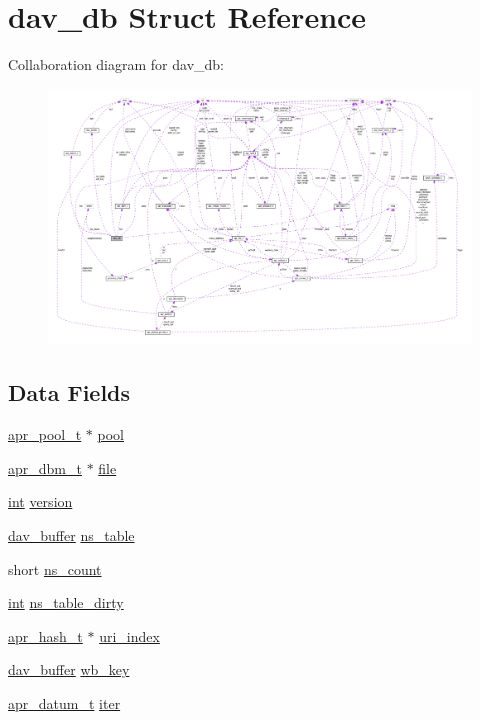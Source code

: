 \hypertarget{structdav__db}{}\section{dav\+\_\+db Struct Reference}
\label{structdav__db}


Collaboration diagram for dav\+\_\+db\+:
\nopagebreak
\begin{figure}[H]
\begin{center}
\leavevmode
\includegraphics[width=350pt]{structdav__db__coll__graph}
\end{center}
\end{figure}
\subsection*{Data Fields}
\begin{DoxyCompactItemize}
\item 
\hyperlink{structapr__pool__t}{apr\+\_\+pool\+\_\+t} $\ast$ \hyperlink{structdav__db_abdc510467d96807a3a9126b408ce2cfe}{pool}
\item 
\hyperlink{structapr__dbm__t}{apr\+\_\+dbm\+\_\+t} $\ast$ \hyperlink{structdav__db_a7561c0d3f8264bd9afb7194dcc48be98}{file}
\item 
\hyperlink{pcre_8txt_a42dfa4ff673c82d8efe7144098fbc198}{int} \hyperlink{structdav__db_a2703c564ab6767305b64972df53fde27}{version}
\item 
\hyperlink{structdav__buffer}{dav\+\_\+buffer} \hyperlink{structdav__db_a36b4801eebea2ac01d1b3f1320976b07}{ns\+\_\+table}
\item 
short \hyperlink{structdav__db_a6a13abe6c78b05f64a20984856ca2b06}{ns\+\_\+count}
\item 
\hyperlink{pcre_8txt_a42dfa4ff673c82d8efe7144098fbc198}{int} \hyperlink{structdav__db_a3e677b5ee2700749a9a72e3a3c26bf87}{ns\+\_\+table\+\_\+dirty}
\item 
\hyperlink{structapr__hash__t}{apr\+\_\+hash\+\_\+t} $\ast$ \hyperlink{structdav__db_ac73ba0df7375febb3fd32baec03714a1}{uri\+\_\+index}
\item 
\hyperlink{structdav__buffer}{dav\+\_\+buffer} \hyperlink{structdav__db_a17375a25f98cd2f5edd4b133803dab70}{wb\+\_\+key}
\item 
\hyperlink{structapr__datum__t}{apr\+\_\+datum\+\_\+t} \hyperlink{structdav__db_a987cc981303b2c1d88a163496e2b4e99}{iter}
\end{DoxyCompactItemize}


